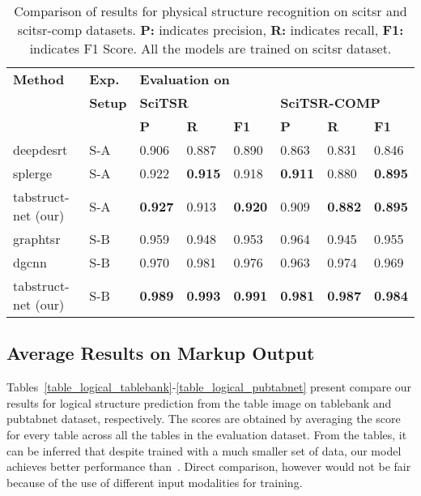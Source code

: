 \documentclass[runningheads]{llncs}
\begin{document}
\begin{table}
\begin{center}
\begin{tabular}{|l |l|l l l|l l l|} \hline
\textbf{Method} &\textbf{Exp.} &\multicolumn{6}{|l|}{\textbf{Evaluation on}} \\ \cline{3-8}
 &\textbf{Setup} &\multicolumn{3}{|l|}{\textbf{SciTSR}} &\multicolumn{3}{|l|}{\textbf{SciTSR-COMP}} \\ \cline{3-8}
 & &\textbf{P} &\textbf{R} &\textbf{F1} &\textbf{P} &\textbf{R} &\textbf{F1} \\ \hline
{\sc d}eep{\sc d}e{\sc srt}~\cite{schreiber2017deepdesrt} &S-A &0.906 &0.887 &0.890 &0.863 &0.831 &0.846 \\ 
{\sc splerge}~\cite{table_splitting} &S-A &0.922 &\textbf{0.915} &0.918 &\textbf{0.911} &0.880 &\textbf{0.895} \\ 
{\sc t}ab{\sc s}truct-{\sc n}et (our) &S-A &\textbf{0.927} &0.913 &\textbf{0.920} &0.909 &\textbf{0.882} &\textbf{0.895} \\ \hline
{\sc g}raph{\sc tsr}~\cite{chi2019complicated} &S-B &0.959 &0.948 &0.953 &0.964 &0.945 &0.955 \\
{\sc dgcnn}~\cite{qasim2019rethinking} &S-B &0.970 &0.981 &0.976 &0.963 &0.974 &0.969 \\
{\sc t}ab{\sc s}truct-{\sc n}et (our) &S-B &\textbf{0.989} &\textbf{0.993} &\textbf{0.991} &\textbf{0.981} &\textbf{0.987} &\textbf{0.984} \\ \hline 
\end{tabular}
\end{center}
\caption{Comparison of results for physical structure recognition on {\sc s}ci{\sc tsr} and {\sc s}ci{\sc tsr-comp} datasets. \textbf{P:} indicates precision, \textbf{R:} indicates recall, \textbf{F1:} indicates F1 Score. All the models are trained on {\sc s}ci{\sc tsr} dataset.} \label{table_physical_scistr}
\vspace{-1.5em}
\end{table}

\newpage
\subsection*{Average Results on Markup Output}

Tables~\ref{table_logical_tablebank}-\ref{table_logical_pubtabnet} present compare our results for logical structure prediction from the table image on {\sc t}able{\sc b}ank and {\sc p}ub{\sc t}ab{\sc n}et dataset, respectively. The scores are obtained by averaging the score for every table across all the tables in the evaluation dataset. From the tables, it can be inferred that despite trained with a much smaller set of data, our model achieves better performance than~\cite{zhong2019image}. Direct comparison, however would not be fair because of the use of different input modalities for training.
\end{document}
